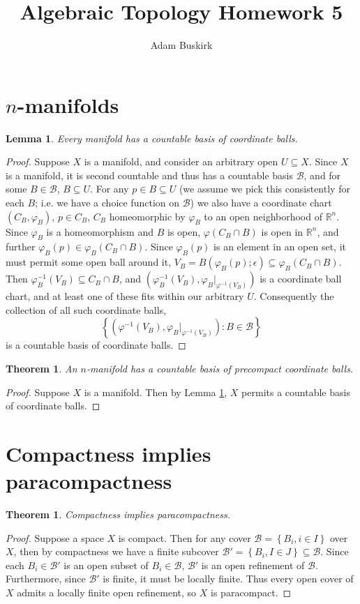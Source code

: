 \documentclass{article}
\title{Algebraic Topology Homework 5}
\author{Adam Buskirk}
\newtheorem{theorem}[subsection]{Theorem}
\newtheorem{lemma}[subsection]{Lemma}
\theoremstyle{definition}
\newcommand{\R}{\mathbb{R}}
\newcommand{\set}[1]{\left\{#1\right\}}
\begin{document}
\maketitle

\section{$n$-manifolds}
\begin{lemma}\label{lemma1}
Every manifold has a countable basis of coordinate balls.
\end{lemma}
\begin{proof}
Suppose $X$ is a manifold, and consider an arbitrary open
$U \subseteq X$. Since $X$ is a manifold, it is second countable
and thus has a countable 
basis $\mathcal{B}$, and for some $B \in \mathcal{B}$,
$B \subseteq U$. For any $p \in B \subseteq U$ (we assume we pick this
consistently for each $B$; i.e. we have a choice function on $\mathcal{B}$) 
we also have a 
coordinate chart $(C_B,\varphi_B)$, $p \in C_B$, $C_B$ homeomorphic by
$\varphi_B$ to an open neighborhood of $\R^n$. Since $\varphi_B$ is 
a homeomorphism and $B$ is open, $\varphi(C_B \cap B)$ is open in
$\R^n$, and further $\varphi_B(p) \in \varphi_B(C_B \cap B)$. Since 
$\varphi_B(p)$ is an element in an open set, it must permit some open
ball around it, 
$V_B=B(\varphi_B(p); \epsilon) \subseteq \varphi_B(C_B \cap B)$. Then
$\varphi_B^{-1}(V_B) \subseteq C_B \cap B$, and 
$(\varphi_B^{-1}(V_B),\varphi_B|_{\varphi^{-1}(V_B)})$ is a coordinate 
ball chart, and at least one of these fits within our arbitrary $U$.
Consequently the collection
of all such coordinate balls, 
\[ \set{ (\varphi^{-1}(V_B),\varphi_B|_{\varphi^{-1}(V_B)}) : B \in \mathcal{B}}\]
is a countable basis of coordinate balls.
\end{proof}

\begin{theorem}
An $n$-manifold has a countable basis of precompact coordinate balls.
\end{theorem}
\begin{proof}
Suppose $X$ is a manifold. Then by Lemma \ref{lemma1}, 
$X$ permits a countable basis of coordinate balls.
\end{proof}

\section{Compactness implies paracompactness}
\begin{theorem}
Compactness implies paracompactness.
\end{theorem}
\begin{proof}
Suppose a space $X$ is compact. Then for any cover $\mathcal{B}
=\set{B_i, i\in I}$ over $X$,
then by compactness we have a finite subcover 
$\mathcal{B}'=\set{B_i, I\in J} \subseteq \mathcal{B}$. Since each 
$B_i \in \mathcal{B}'$ is an open subset of $B_i \in \mathcal{B}$, 
$\mathcal{B}'$ is an open refinement of $\mathcal{B}$. Furthermore, since
$\mathcal{B}'$ is finite, it must be locally finite. Thus
every open cover of $X$ admits a locally finite open refinement, so $X$
is paracompact.
\end{proof}
\end{document}
